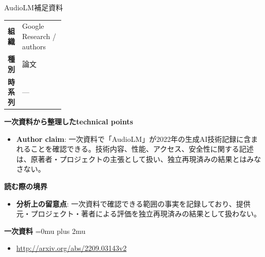 \begin{technicalnote}{AudioLM}{補足資料}
\begingroup
\begin{tabularx}{\linewidth}{@{}>{\bfseries}p{0.22\linewidth}X@{}}
組織 & Google Research / authors \\
種別 & 論文 \\
時系列 & — \\
\end{tabularx}
\smallskip
{\bfseries 一次資料から整理したtechnical points}
\begin{itemize}[leftmargin=1.5em,itemsep=0.35em]
\item \textbf{Author claim}: 一次資料で「AudioLM」が2022年の生成AI技術記録に含まれることを確認できる。技術内容、性能、アクセス、安全性に関する記述は、原著者・プロジェクトの主張として扱い、独立再現済みの結果とはみなさない。
\end{itemize}
\begin{minipage}{\linewidth}
{\bfseries 読む際の境界}
\begin{itemize}[leftmargin=1.5em,itemsep=0.35em]
\item \textbf{分析上の留意点}: 一次資料で確認できる範囲の事実を記録しており、提供元・プロジェクト・著者による評価を独立再現済みの結果として扱わない。
\end{itemize}
\begin{samepage}
{\bfseries 一次資料}
\begingroup\sloppy
\Urlmuskip=0mu plus 2mu\relax
\begin{itemize}[leftmargin=1.5em,itemsep=0.25em]
\item {\scriptsize\url{http://arxiv.org/abs/2209.03143v2}}
\end{itemize}
\endgroup
\end{samepage}
\end{minipage}
\endgroup
\end{technicalnote}
\medskip

